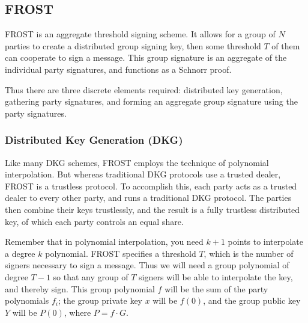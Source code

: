 \documentclass{article}
\theoremstyle{plain}
\theoremstyle{definition}
\theoremstyle{remark}
\begin{document}
\subsection{
  FROST
}

FROST is an aggregate threshold signing scheme.  It allows for a group of $N$ parties to create a distributed group signing key, then some threshold $T$ of them can cooperate to sign a message.  This group signature is an aggregate of the individual party signatures, and functions as a Schnorr proof.

Thus there are three discrete elements required: distributed key generation, gathering party signatures, and forming an aggregate group signature using the party signatures.

\subsubsection{
  Distributed Key Generation (DKG)
}

Like many DKG schemes, FROST employs the technique of polynomial interpolation.  But whereas traditional DKG protocols use a trusted dealer, FROST is a trustless protocol.  To accomplish this, each party acts as a trusted dealer to every other party, and runs a traditional DKG protocol.  The parties then combine their keys trustlessly, and the result is a fully trustless distributed key, of which each party controls an equal share.

Remember that in polynomial interpolation, you need $k+1$ points to interpolate a degree $k$ polynomial.  FROST specifies a threshold $T$, which is the number of signers necessary to sign a message.  Thus we will need a group polynomial of degree $T-1$ so that any group of $T$ signers will be able to interpolate the key, and thereby sign.  This group polynomial $f$ will be the sum of the party polynomials $f_i$; the group private key $x$ will be $f(0)$, and the group public key $Y$ will be $P(0)$, where $P = f \cdot G$.
\end{document}
